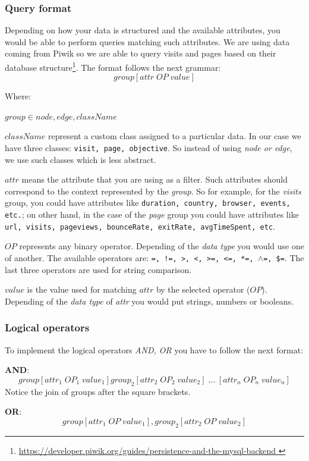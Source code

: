 \documentclass[preprint,12pt,3p]{elsarticle}
\begin{document}
\subsubsection{Query format}
Depending on how your data is structured and the available attributes, you would be able to perform queries matching such attributes. We are using data coming from Piwik so we are able to query visits and pages based on their database structure\footnote{\url{ https://developer.piwik.org/guides/persistence-and-the-mysql-backend }}.
The format follows the next grammar:
\[
group[ attr \; OP \; value ]
\]

Where:

$ group \in node, edge, className $

$className$ represent a custom class assigned to a particular data. In our case we have three classes: \texttt{visit, page, objective}. So instead of using \textit{node or edge}, we use such classes which is less abstract.

$attr$ means the attribute that you are using as a filter. Such attributes should correspond to the context represented by the \textit{group}. So for example, for the \textit{visits} group, you could have attributes like \texttt{duration, country, browser, events, etc.}; on other hand, in the case of the \textit{page} group you could have attributes like \texttt{url, visits, pageviews, bounceRate, exitRate, avgTimeSpent, etc}.

$OP$ represents any binary operator. Depending of the \textit{data type} you would use one of another. The available operators are: \texttt{=, !=, >, <, >=, <=, *=, $\land$=, \$=}. The last three operators are used for string comparison.

$value$ is the value used for matching $attr$ by the selected operator ($OP$). Depending of the \textit{data type} of \textit{attr} you would put strings, numbers or booleans.

\subsubsection{Logical operators}
To implement the logical operators \textit{AND, OR} you have to follow the next format:

\textbf{AND}:
\[
group[attr_1 \; OP_1 \; value_1]group_2[attr_2 \; OP_2 \; value_2] \; \ldots \; [attr_n \; OP_n \; value_n]
\]
Notice the join of groups after the square brackets.

\textbf{OR}:
\[
group[attr_1 \; OP \; value_1],group_2[ attr_2 \; OP \; value_2]
\]
\end{document}

